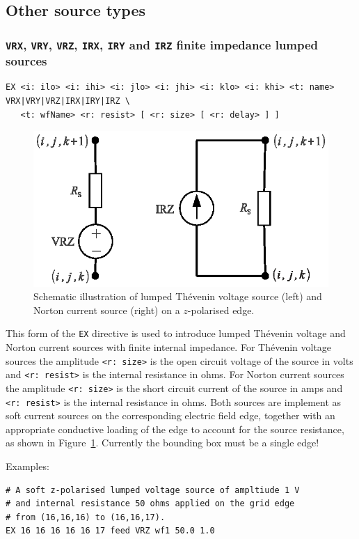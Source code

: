 \documentclass[onecolumn,a4paper]{article}
\numberwithin{equation}{section}
\begin{document}
\subsection{Other source types}

\subsubsection{\texttt{VRX}, \texttt{VRY}, \texttt{VRZ}, \texttt{IRX}, \texttt{IRY} and \texttt{IRZ} finite impedance lumped sources}

\begin{verbatim}
EX <i: ilo> <i: ihi> <i: jlo> <i: jhi> <i: klo> <i: khi> <t: name> VRX|VRY|VRZ|IRX|IRY|IRZ \
   <t: wfName> <r: resist> [ <r: size> [ <r: delay> ] ]
\end{verbatim}

\begin{figure}[ht]
  \begin{center}
   \includegraphics[width=0.4\linewidth]{figures/lumped_src}
  \end{center}
  \vspace{-5mm}
  \caption{\label{fg:lumped_src}Schematic illustration of lumped Th{\'e}venin voltage source (left)
  and Norton current source (right) on a $z$-polarised edge.}
\end{figure}

This form of the \texttt{EX} directive is used to introduce lumped Th{\'e}venin voltage and
Norton current sources with finite internal impedance. For Th{\'e}venin voltage sources
the amplitude \texttt{<r:~size>} is the open circuit voltage of the source in volts and
\texttt{<r:~resist>} is the internal resistance in ohms. For Norton current sources
the amplitude \texttt{<r:~size>} is the short circuit current of the source in amps and
\texttt{<r:~resist>} is the internal resistance in ohms. Both sources are implement as soft 
current sources on the corresponding electric field edge, together with an appropriate
conductive loading of the edge to account for the source resistance, as shown in Figure~\ref{fg:lumped_src}.
Currently the bounding box must be a single edge!

Examples:
\begin{verbatim}
# A soft z-polarised lumped voltage source of ampltiude 1 V
# and internal resistance 50 ohms applied on the grid edge 
# from (16,16,16) to (16,16,17).
EX 16 16 16 16 16 17 feed VRZ wf1 50.0 1.0
\end{verbatim}
\end{document}
